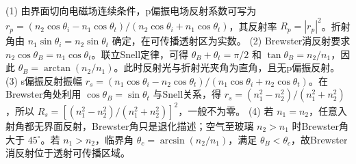 (1) 由界面切向电磁场连续条件，p偏振电场反射系数可写为 \(r_p=(n_2\cos\theta_i-n_1\cos\theta_t)/(n_2\cos\theta_i+n_1\cos\theta_t)\)，其反射率 \(R_p=|r_p|^2\)。折射角由 \(n_1\sin\theta_i=n_2\sin\theta_t\) 确定，在可传播透射区为实数。
(2) Brewster消反射要求 \(n_2\cos\theta_B=n_1\cos\theta_t\)。联立Snell定律，可得 \(\theta_B+\theta_t=\pi/2\) 和 \(\tan\theta_B=n_2/n_1\)，因此 \(\theta_B=\arctan(n_2/n_1)\)。此时反射光与折射光夹角为直角，且无p偏振反射。
(3) s偏振反射振幅 \(r_s=(n_1\cos\theta_i-n_2\cos\theta_t)/(n_1\cos\theta_i+n_2\cos\theta_t)\)。在Brewster角处利用 \(\cos\theta_B=\sin\theta_t\) 与Snell关系，得 \(r_s=(n_1^2-n_2^2)/(n_1^2+n_2^2)\)，所以 \(R_s=[(n_1^2-n_2^2)/(n_1^2+n_2^2)]^2\)，一般不为零。
(4) 若 \(n_1=n_2\)，任意入射角都无界面反射，Brewster角只是退化描述；空气至玻璃 \(n_2>n_1\) 时Brewster角大于 \(45^\circ\)。若 \(n_1>n_2\)，临界角 \(\theta_c=\arcsin(n_2/n_1)\)，满足 \(\theta_B<\theta_c\)，故Brewster消反射位于透射可传播区域。
